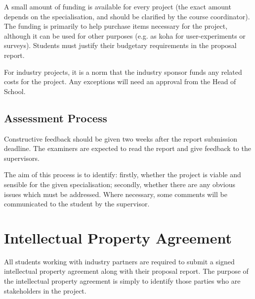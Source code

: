 A small amount of funding is available for every project (the exact
amount depends on the specialisation, and should be clarified by the
course coordinator).  The funding is primarily to help purchase items
necessary for the project, although it can be used for other purposes
(e.g. as koha for user-experiments or surveys).  Students must justify their
budgetary requirements in the proposal report.

For industry projects, it is a norm that the industry sponsor funds any related costs for the project. Any exceptions will need an approval from the Head of School.

\subsection{Assessment Process}

{Constructive feedback should be given two weeks after the report submission deadline.  The examiners are expected to read the report and give feedback to the supervisors.}

The aim of this process is to identify:
firstly, whether the project is viable and sensible for the given
specialisation; secondly, whether there are any obvious issues which
must be addressed.  Where necessary, some comments will be communicated
to the student by the supervisor.

\section{Intellectual Property Agreement}

All students working with industry partners are required to submit a signed intellectual property agreement along with their {proposal report}.  The purpose of the intellectual property agreement is simply to identify those parties who are stakeholders in the project.
